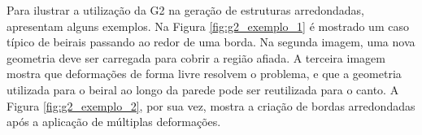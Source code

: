 \begin{figure}[h!]
	\centering
	\captionsetup{width=15cm}
	{}	
\end{figure}

\newpage

Para ilustrar a utilização da \gls{G2} na geração de estruturas arredondadas,  apresentam alguns exemplos. Na Figura \ref{fig:g2_exemplo_1} é mostrado um caso típico de beirais passando ao redor de uma borda. Na segunda imagem, uma nova geometria deve ser carregada para cobrir a região afiada. A terceira imagem mostra que deformações de forma livre resolvem o problema, e que a geometria utilizada para o beiral ao longo da parede pode ser reutilizada para o canto. A Figura \ref{fig:g2_exemplo_2}, por sua vez, mostra a criação de bordas arredondadas após a aplicação de múltiplas deformações.

\begin{figure}[h!]
	\centering
	\captionsetup{width=15cm}
	{}	
\end{figure}

